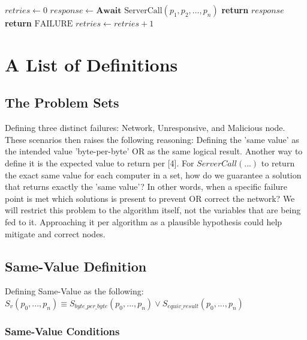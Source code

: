 \documentclass[10pt, twocolumn]{article}
\theoremstyle{plain}
\theoremstyle{definition}
\theoremstyle{remark}
\begin{document}
\begin{algorithm}
\caption{Client(...)}
\begin{algorithmic}[1]
    \State $retries \leftarrow 0$
        \State $response \leftarrow \textbf{Await } \text{ServerCall}(p_1, p_2, \dots, p_n)$
            \State \textbf{return} $response$
            \State \textbf{return} $\text{FAILURE}$
        \Else
            \State $retries \leftarrow retries + 1$
        \EndIf
    \EndWhile
\EndProcedure
\end{algorithmic}
\end{algorithm}

\section{A List of Definitions}

\subsection{The Problem Sets}

Defining three distinct failures: Network, Unresponsive, and Malicious node. These scenarios then raises the following reasoning: Defining the 'same value' as the intended value 'byte-per-byte' OR as the same logical result. Another way to define it is the expected value to return per [4].
For $ServerCall(...)$ to return the exact same value for each computer in a set, how do we guarantee a solution that returns exactly the 'same value'? In other words, when a specific failure point is met which solutions is present to prevent OR correct the network? We will restrict this problem to the algorithm itself, not the variables that are being fed to it. Approaching it per algorithm as a plausible hypothesis could help mitigate and correct nodes.

\subsection{Same-Value Definition}

Defining Same-Value as the following: $S_{v}(p_{0}, ..., p_{n}) \equiv{} S_{byte\_per\_byte}(p_{0}, ..., p_{n}) \vee S_{equiv\_result}(p_{0}, ..., p_{n})$

\subsubsection{Same-Value Conditions}
\end{document}

